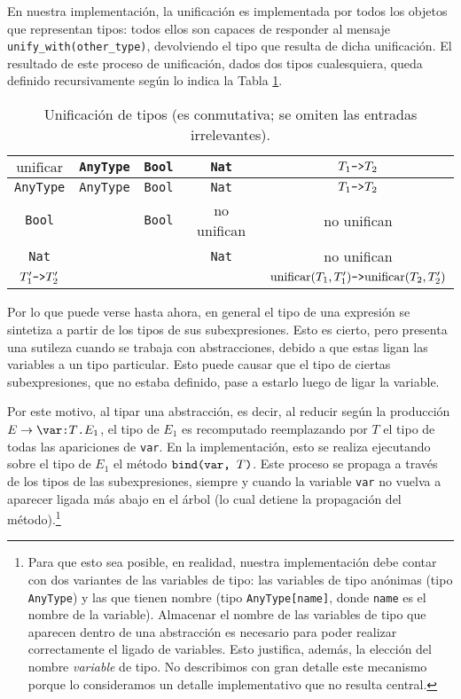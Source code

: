 \documentclass[11pt]{article}
\begin{document}
En nuestra implementación, la unificación es implementada por
todos los objetos que representan tipos: todos ellos son capaces de
responder al mensaje \lstinline{unify_with(other_type)}, devolviendo el tipo
que resulta de dicha unificación.
El resultado de este proceso de unificación, dados dos tipos cualesquiera,
queda definido recursivamente según lo indica la Tabla \ref{table:unificacion}.

\begin{table} \centering
\begin{tabular}{c|c|c|c|c}
$\text{unificar}$   & \verb|AnyType| & \verb|Bool| & \verb|Nat|  & $T_1\verb|->|T_2$ \\ \hline
\verb|AnyType|      & \verb|AnyType| & \verb|Bool| & \verb|Nat|  & $T_1\verb|->|T_2$ \\
\verb|Bool|         &                & \verb|Bool| & no unifican & no unifican       \\
\verb|Nat|          &                &             & \verb|Nat|  & no unifican       \\
$T'_1\verb|->|T'_2$ &                &             &             &
	$\text{unificar}(T_1,T'_1)\verb|->|\text{unificar}(T_2,T'_2)$ \\
\end{tabular}
\caption{Unificación de tipos (es conmutativa; se omiten las entradas
	irrelevantes).}
\label{table:unificacion}
\end{table}

Por lo que puede verse hasta ahora, en general el tipo de una expresión
se sintetiza a partir de los tipos de sus subexpresiones. Esto es cierto, pero
presenta una sutileza cuando se trabaja con abstracciones, debido a que estas
ligan las variables a un tipo particular. Esto puede causar que el tipo de
ciertas subexpresiones, que no estaba definido, pase a estarlo luego de ligar
la variable.

Por este motivo, al tipar una abstracción, es decir, al reducir según la
producción $E \rightarrow \verb|\var:| T \verb|.| E_1$, el tipo de
$E_1$ es recomputado reemplazando por $T$ el tipo de todas las apariciones de
\verb|var|. En la implementación, esto se realiza ejecutando sobre el tipo de 
$E_1$ el método $\verb|bind(var, |T\verb|)|$. Este proceso se propaga a través
de los tipos de las subexpresiones, siempre y cuando la variable \verb|var|
no vuelva a aparecer ligada más abajo en el árbol (lo cual detiene la
propagación del método).\footnote{Para que esto sea posible, en 
realidad, nuestra implementación debe contar con dos variantes de las
variables de tipo: las variables de tipo anónimas (tipo \texttt{AnyType}) y
las que tienen nombre (tipo \texttt{AnyType[name]}, donde \texttt{name} es el
nombre de la variable). Almacenar el nombre de las variables de tipo que
aparecen dentro de una abstracción es necesario para poder realizar
correctamente el ligado de variables. Esto justifica, además, la elección del
nombre \emph{variable} de tipo. No describimos con gran detalle este mecanismo
porque lo consideramos un detalle implementativo que no resulta central.}
\end{document}
